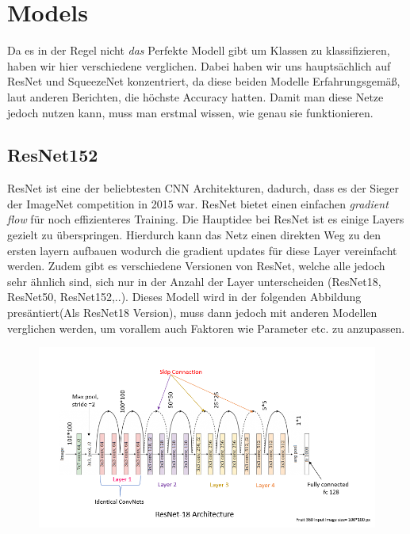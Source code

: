 \chapter{Models}
\label{ch:models}

Da es in der Regel nicht \textit{das} Perfekte Modell gibt um Klassen zu klassifizieren, haben wir hier verschiedene verglichen. Dabei haben wir uns hauptsächlich auf ResNet und SqueezeNet konzentriert, da diese beiden Modelle Erfahrungsgemäß, laut anderen Berichten, die höchste Accuracy hatten.
Damit man diese Netze jedoch nutzen kann, muss man erstmal wissen, wie genau sie funktionieren.

\section{ResNet152}

ResNet ist eine der beliebtesten CNN Architekturen, dadurch, dass es der Sieger der ImageNet competition in 2015 war. ResNet bietet einen einfachen \textit{gradient flow} für noch effizienteres Training.
\newline Die Hauptidee bei ResNet ist es einige Layers gezielt zu überspringen. Hierdurch kann das Netz einen direkten Weg zu den ersten layern aufbauen wodurch die gradient updates für diese Layer vereinfacht werden. Zudem gibt es verschiedene Versionen von ResNet, welche alle jedoch sehr ähnlich sind, sich nur in der Anzahl der Layer unterscheiden (ResNet18, ResNet50, ResNet152,..).
Dieses Modell wird in der folgenden Abbildung presäntiert(Als ResNet18 Version), muss dann jedoch mit anderen Modellen verglichen werden, um vorallem auch Faktoren wie Parameter etc. zu anzupassen.

\begin{figure}[H]
    \centering
    \includegraphics[width=1.1\textwidth]{Bilder/ResNet18Model.png}
    \caption{}
    \label{fig:ResNet18}
\end{figure}

